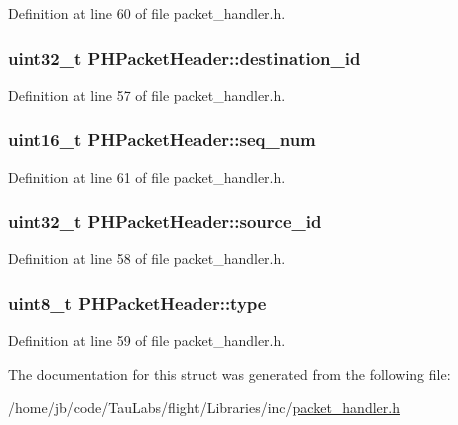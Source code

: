 \-Definition at line 60 of file packet\-\_\-handler.\-h.

\hypertarget{struct_p_h_packet_header_a19915477b7c7c9c24b293ba4db7c6426}{
\subsubsection[{destination\-\_\-id}]{\setlength{\rightskip}{0pt plus 5cm}uint32\-\_\-t {\bf \-P\-H\-Packet\-Header\-::destination\-\_\-id}}}\label{struct_p_h_packet_header_a19915477b7c7c9c24b293ba4db7c6426}


\-Definition at line 57 of file packet\-\_\-handler.\-h.

\hypertarget{struct_p_h_packet_header_a3d0a8a439dadc33b716f7e926a9546cf}{
\subsubsection[{seq\-\_\-num}]{\setlength{\rightskip}{0pt plus 5cm}uint16\-\_\-t {\bf \-P\-H\-Packet\-Header\-::seq\-\_\-num}}}\label{struct_p_h_packet_header_a3d0a8a439dadc33b716f7e926a9546cf}


\-Definition at line 61 of file packet\-\_\-handler.\-h.

\hypertarget{struct_p_h_packet_header_a93bf1fc396b4d98f870fee75682423b7}{
\subsubsection[{source\-\_\-id}]{\setlength{\rightskip}{0pt plus 5cm}uint32\-\_\-t {\bf \-P\-H\-Packet\-Header\-::source\-\_\-id}}}\label{struct_p_h_packet_header_a93bf1fc396b4d98f870fee75682423b7}


\-Definition at line 58 of file packet\-\_\-handler.\-h.

\hypertarget{struct_p_h_packet_header_ad816b782c8c40b9e03bdf092fd37bb3c}{
\subsubsection[{type}]{\setlength{\rightskip}{0pt plus 5cm}uint8\-\_\-t {\bf \-P\-H\-Packet\-Header\-::type}}}\label{struct_p_h_packet_header_ad816b782c8c40b9e03bdf092fd37bb3c}


\-Definition at line 59 of file packet\-\_\-handler.\-h.



\-The documentation for this struct was generated from the following file\-:\begin{DoxyCompactItemize}
\item 
/home/jb/code/\-Tau\-Labs/flight/\-Libraries/inc/\hyperlink{packet__handler_8h}{packet\-\_\-handler.\-h}\end{DoxyCompactItemize}
